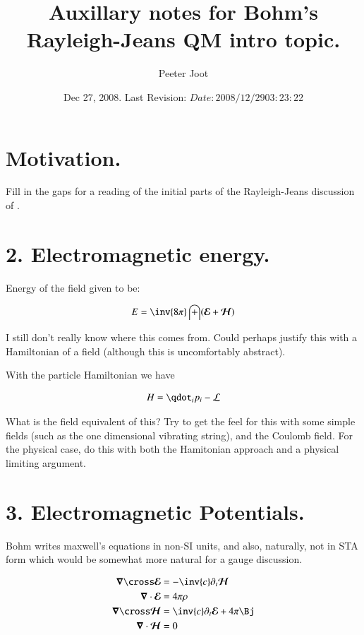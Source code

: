 \documentclass{article}
\title{ Auxillary notes for Bohm's Rayleigh-Jeans QM intro topic. }
\author{Peeter Joot}
\date{ Dec 27, 2008.  Last Revision: $Date: 2008/12/29 03:23:22 $ }
\newcommand{\EE}[0]{\boldsymbol{\mathcal{E}}}
\newcommand{\HH}[0]{\boldsymbol{\mathcal{H}}}
\begin{document}
\maketitle{}


\section{ Motivation. }

Fill in the gaps for a reading of the
initial parts of the Rayleigh-Jeans discussion of \cite{bohm1989qt}.

\section{ 2. Electromagnetic energy. }

Energy of the field given to be:

\begin{align*}
E = \inv{8\pi} \int (\EE + \HH)
\end{align*}

I still don't really know where this comes from.
Could perhaps justify this with a Hamiltonian of a field (although this is
uncomfortably abstract).

With the particle Hamiltonian we have

\begin{align*}
H = \qdot_i p_i -\LL
\end{align*}

What is the field equivalent of this?  Try to get the feel for this with some simple fields (such as the one dimensional vibrating string), and the Coulomb field.  For the physical case, do this with both the Hamitonian approach and a physical limiting argument.

\section{ 3. Electromagnetic Potentials. }

Bohm writes maxwell's equations in non-SI units, and also, naturally, not in STA form which would be somewhat more natural for a gauge
discussion.

\begin{align*}
\spacegrad \cross \EE &= -\inv{c} \partial_t \HH \\
\spacegrad \cdot \EE &= 4 \pi \rho \\
\spacegrad \cross \HH &= \inv{c} \partial_t \EE + 4 \pi \Bj \\
\spacegrad \cdot \HH &= 0
\end{align*}
\end{document}
